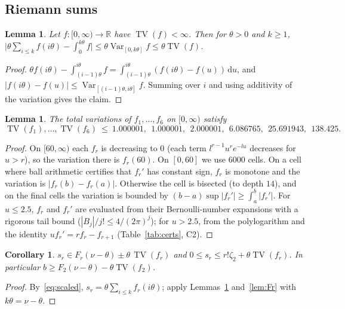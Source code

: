 \documentclass[11pt]{amsart}
\newtheorem{lemma}[theorem]{Lemma}
\newtheorem{corollary}[theorem]{Corollary}
\theoremstyle{definition}
\theoremstyle{remark}
\numberwithin{equation}{section}
\newcommand{\RR}{\mathbb{R}}
\newcommand{\TV}{\operatorname{TV}}
\newcommand{\Var}{\operatorname{Var}}
\newcommand{\dd}{\,\mathrm{d}}
\begin{document}
\subsection{Riemann sums}
\begin{lemma}\label{lem:riemann}
Let $f:[0,\infty)\to\RR$ have $\TV(f)<\infty$. Then for $\theta>0$ and $k\ge1$,
$\bigl|\theta\sum_{i\le k}f(i\theta)-\int_0^{k\theta}f\bigr|\le\theta\Var_{[0,k\theta]}f\le\theta\TV(f)$.
\end{lemma}

\begin{proof}
$\theta f(i\theta)-\int_{(i-1)\theta}^{i\theta}f=\int_{(i-1)\theta}^{i\theta}(f(i\theta)-f(u))\dd u$, and $|f(i\theta)-f(u)|\le\Var_{[(i-1)\theta,i\theta]}f$.
Summing over $i$ and using additivity of the variation gives the claim.
\end{proof}

\begin{lemma}\label{lem:TV}
The total variations of $f_1,\dots,f_6$ on $[0,\infty)$ satisfy
\[
  \TV(f_1),\dots,\TV(f_6)\ \le\ 1.000001,\ \ 1.000001,\ \ 2.000001,\ \ 6.086765,\ \ 25.691943,\ \ 138.425 .
\]
\end{lemma}

\begin{proof}
On $[60,\infty)$ each $f_r$ is decreasing to $0$ (each term $l^{r-1}u^re^{-lu}$ decreases for $u>r$), so the variation there is $f_r(60)$.
On $[0,60]$ we use $6000$ cells. On a cell where ball arithmetic certifies that $f_r'$ has constant sign, $f_r$ is monotone and the
variation is $|f_r(b)-f_r(a)|$. Otherwise the cell is bisected (to depth $14$), and on the final cells the variation is bounded by
$(b-a)\sup|f_r'|\ge\int_a^b|f_r'|$. For $u\le2.5$, $f_r$ and $f_r'$ are evaluated from their Bernoulli-number expansions with a rigorous
tail bound ($|B_j|/j!\le4/(2\pi)^j$); for $u>2.5$, from the polylogarithm and the identity $uf_r'=rf_r-f_{r+1}$
(Table~\ref{tab:certs}, C2).
\end{proof}

\begin{corollary}\label{cor:sr}
$s_r\in F_r(\nu-\theta)\pm\theta\,\TV(f_r)$ and $0\le s_r\le r!\zeta_2+\theta\TV(f_r)$. In particular
$b\ge F_2(\nu-\theta)-\theta\TV(f_2)$.
\end{corollary}

\begin{proof}
By~\eqref{eq:scaled}, $s_r=\theta\sum_{i\le k}f_r(i\theta)$; apply Lemmas~\ref{lem:riemann} and~\ref{lem:Fr} with $k\theta=\nu-\theta$.
\end{proof}
\end{document}
